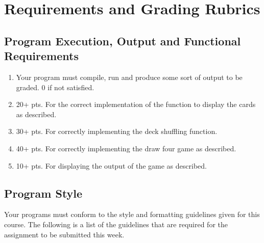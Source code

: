 \documentclass[11pt]{article}
\begin{document}
\section*{Requirements and Grading Rubrics}
\label{sec-5}

\subsection*{Program Execution, Output and Functional Requirements}
\label{sec-5-1}

\begin{enumerate}
\item Your program must compile, run and produce some sort of output to
be graded. 0 if not satisfied.
\item 20+ pts. For the correct implementation of the function to display the
cards as described.
\item 30+ pts. For correctly implementing the deck shuffling function.
\item 40+ pts. For correctly implementing the draw four game as described.
\item 10+ pts. For displaying the output of the game as described.
\end{enumerate}

\subsection*{Program Style}
\label{sec-5-2}

Your programs must conform to the style and formatting guidelines
given for this course.  The following is a list of the guidelines that
are required for the assignment to be submitted this week.
\end{document}
